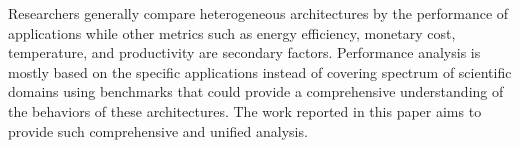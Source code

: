 Researchers generally compare heterogeneous architectures by the performance of 
applications while other metrics such as energy efficiency, 
monetary cost, temperature, and productivity are secondary factors. %
Performance analysis is mostly based on the specific applications instead of covering spectrum of scientific domains using benchmarks
that could provide a comprehensive understanding of the behaviors of these architectures. 
The work reported in this paper aims to provide such comprehensive and unified analysis. 


